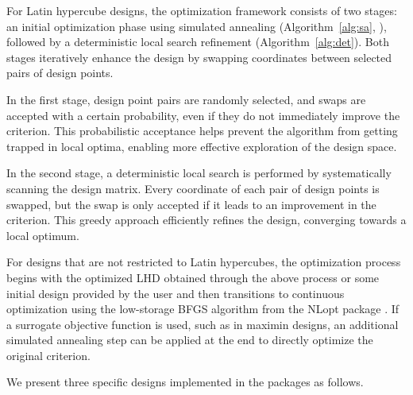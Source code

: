 For Latin hypercube designs, the optimization framework consists of two stages: an initial optimization phase using simulated annealing (Algorithm~\ref{alg:sa}, \cite{morris1995exploratory}), followed by a deterministic local search refinement (Algorithm~\ref{alg:det}). Both stages iteratively enhance the design by swapping coordinates between selected pairs of design points. 

In the first stage, design point pairs are randomly selected, and swaps are accepted with a certain probability, even if they do not immediately improve the criterion. This probabilistic acceptance helps prevent the algorithm from getting trapped in local optima, enabling more effective exploration of the design space.

In the second stage, a deterministic local search is performed by systematically scanning the design matrix. Every coordinate of each pair of design points is swapped, but the swap is only accepted if it leads to an improvement in the criterion. This greedy approach efficiently refines the design, converging towards a local optimum. 

For designs that are not restricted to Latin hypercubes, the optimization process begins with the optimized LHD obtained through the above process or some initial design provided by the user and then transitions to continuous optimization using the low-storage BFGS algorithm from the NLopt package \citep{liu1989limited, nloptr}. If a surrogate objective function is used, such as in maximin designs, an additional simulated annealing step can be applied at the end to directly optimize the original criterion. 

We present three specific designs implemented in the packages as follows.


